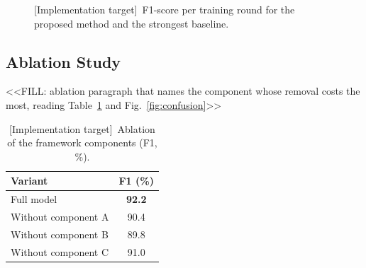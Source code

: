 \documentclass[conference]{IEEEtran}
\newcommand{\tgt}[1]{\textcolor{tgtblue}{#1}}
\newcommand{\tgtcap}{\textcolor{tgtblue}{[Implementation target]}~}
\begin{document}
\begin{figure}[t]
\centering
{}
\caption{\tgtcap F1-score per training round for the proposed method and the strongest baseline.}
\label{fig:curve}
\end{figure}

\subsection{Ablation Study}
<<FILL: ablation paragraph that names the component whose removal costs the most, reading Table~\ref{tab:ablation} and Fig.~\ref{fig:confusion}>>

\begin{table}[t]
\centering
\caption{\tgtcap Ablation of the framework components (F1, \%).}
\label{tab:ablation}
\begin{tabular}{@{}lc@{}}
\toprule
Variant & F1 (\%) \\
\midrule
Full model & \textbf{\tgt{92.2}} \\
Without component A & \tgt{90.4} \\
Without component B & \tgt{89.8} \\
Without component C & \tgt{91.0} \\
\bottomrule
\end{tabular}
\end{table}
\end{document}
